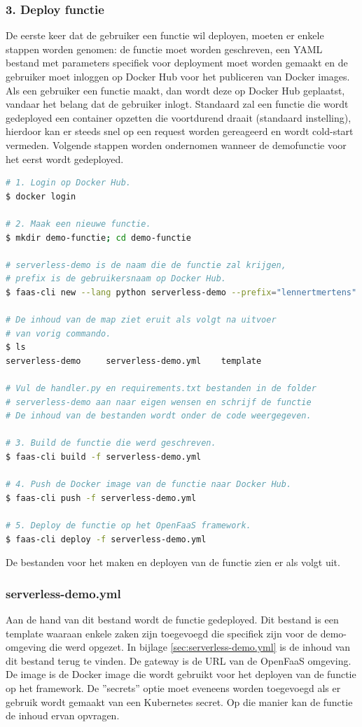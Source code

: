 \subsubsection{3. Deploy functie}
De eerste keer dat de gebruiker een functie wil deployen, moeten er enkele stappen worden genomen: de functie moet worden geschreven, een YAML bestand met parameters specifiek voor deployment moet worden gemaakt en de gebruiker moet inloggen op Docker Hub voor het publiceren van Docker images. Als een gebruiker een functie maakt, dan wordt deze op Docker Hub geplaatst, vandaar het belang dat de gebruiker inlogt. Standaard zal een functie die wordt gedeployed een container opzetten die voortdurend draait (standaard instelling), hierdoor kan er steeds snel op een request worden gereageerd en wordt cold-start vermeden. Volgende stappen worden ondernomen wanneer de demofunctie voor het eerst wordt gedeployed.

\begin{lstlisting}[language=bash]
# 1. Login op Docker Hub.
$ docker login

# 2. Maak een nieuwe functie.
$ mkdir demo-functie; cd demo-functie

# serverless-demo is de naam die de functie zal krijgen,
# prefix is de gebruikersnaam op Docker Hub.
$ faas-cli new --lang python serverless-demo --prefix="lennertmertens"

# De inhoud van de map ziet eruit als volgt na uitvoer 
# van vorig commando.
$ ls
serverless-demo     serverless-demo.yml    template

# Vul de handler.py en requirements.txt bestanden in de folder 
# serverless-demo aan naar eigen wensen en schrijf de functie
# De inhoud van de bestanden wordt onder de code weergegeven.

# 3. Build de functie die werd geschreven.
$ faas-cli build -f serverless-demo.yml

# 4. Push de Docker image van de functie naar Docker Hub.
$ faas-cli push -f serverless-demo.yml

# 5. Deploy de functie op het OpenFaaS framework.
$ faas-cli deploy -f serverless-demo.yml
\end{lstlisting}

De bestanden voor het maken en deployen van de functie zien er als volgt uit.

\subsubsection{serverless-demo.yml}
Aan de hand van dit bestand wordt de functie gedeployed. Dit bestand is een template waaraan enkele zaken zijn toegevoegd die specifiek zijn voor de demo-omgeving die werd opgezet. In bijlage \ref{sec:serverless-demo.yml} is de inhoud van dit bestand terug te vinden. De gateway is de URL van de OpenFaaS omgeving. De image is de Docker image die wordt gebruikt voor het deployen van de functie op het framework. De ''secrets'' optie moet eveneens worden toegevoegd als er gebruik wordt gemaakt van een Kubernetes secret. Op die manier kan de functie de inhoud ervan opvragen.

